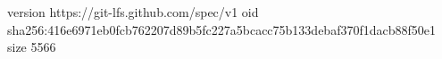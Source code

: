 version https://git-lfs.github.com/spec/v1
oid sha256:416e6971eb0fcb762207d89b5fc227a5bcacc75b133debaf370f1dacb88f50e1
size 5566
